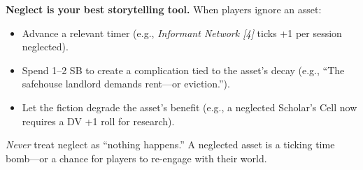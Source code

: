 \begin{tcolorbox}[colback=blue!5!white,colframe=blue!75!black,title={GM Tip: The Asset Neglect Engine},breakable]
\textbf{Neglect is your best storytelling tool.} When players ignore an asset:  
\begin{itemize}
  \item Advance a relevant timer (e.g., \emph{Informant Network [4]} ticks +1 per session neglected).  
  \item Spend 1--2 SB to create a complication tied to the asset's decay (e.g., ``The safehouse landlord demands rent---or eviction.'').  
  \item Let the fiction degrade the asset's benefit (e.g., a neglected Scholar's Cell now requires a DV +1 roll for research).  
\end{itemize}
\textit{Never} treat neglect as ``nothing happens.'' A neglected asset is a ticking time bomb---or a chance for players to re-engage with their world.
\end{tcolorbox}

